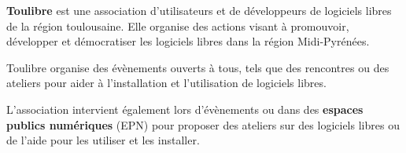 
\textbf{Toulibre} est une association d'utilisateurs et de développeurs de logiciels libres de la région toulousaine. Elle organise des actions visant à promouvoir, développer et démocratiser les logiciels libres dans la région Midi-Pyrénées.

\Separateur

Toulibre organise des évènements ouverts à tous, tels que des rencontres ou des ateliers pour aider à l'installation et l'utilisation de logiciels libres.

L'association intervient également lors d'évènements ou dans des \textbf{espaces publics numériques} (EPN) pour proposer des ateliers sur des logiciels libres ou de l'aide pour les utiliser et les installer.
